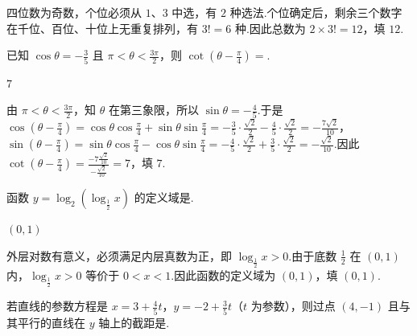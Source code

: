 \documentclass[UTF8,a4paper,oneside,11pt]{ctexbook}
\begin{document}
\begin{solution}
四位数为奇数，个位必须从 \(1\)、\(3\) 中选，有 \(2\) 种选法.个位确定后，剩余三个数字在千位、百位、十位上无重复排列，有 \(3!=6\) 种.因此总数为 \(2\times3!=12\)，填 \(12\).
\end{solution}

\begin{problem}

已知 \(\cos \theta=-\frac{3}{5}\) 且 \(\pi<\theta<\frac{3\pi}{2}\)，则 \(\cot\left( \theta-\frac{\pi}{4} \right)=\)\fillinblank{}.
\end{problem}

\begin{answer}
\(7\)
\end{answer}

\begin{solution}
由 \(\pi<\theta<\frac{3\pi}{2}\)，知 \(\theta\) 在第三象限，所以
\(\sin\theta=-\frac{4}{5}\).于是
\(\cos\left(\theta-\frac{\pi}{4}\right)=\cos\theta\cos\frac{\pi}{4}+\sin\theta\sin\frac{\pi}{4}=-\frac{3}{5}\cdot\frac{\sqrt{2}}{2}-\frac{4}{5}\cdot\frac{\sqrt{2}}{2}=-\frac{7\sqrt{2}}{10}\)，
\(\sin\left(\theta-\frac{\pi}{4}\right)=\sin\theta\cos\frac{\pi}{4}-\cos\theta\sin\frac{\pi}{4}=-\frac{4}{5}\cdot\frac{\sqrt{2}}{2}+\frac{3}{5}\cdot\frac{\sqrt{2}}{2}=-\frac{\sqrt{2}}{10}\).因此
\(\cot\left(\theta-\frac{\pi}{4}\right)=\frac{-7\frac{\sqrt{2}}{10}}{-\frac{\sqrt{2}}{10}}=7\)，填 \(7\).
\end{solution}

\begin{problem}

函数 \(y=\log_2\left( \log_{\frac{1}{2}}x \right)\) 的定义域是\fillinblank{}.
\end{problem}

\begin{answer}
\((0,1)\)
\end{answer}

\begin{solution}
外层对数有意义，必须满足内层真数为正，即
\(\log_{\frac{1}{2}}x>0\).由于底数 \(\frac{1}{2}\) 在 \((0,1)\) 内，\(\log_{\frac{1}{2}}x>0\) 等价于 \(0<x<1\).因此函数的定义域为 \((0,1)\)，填 \((0,1)\).
\end{solution}

\begin{problem}

若直线的参数方程是 \(x=3+\frac{4}{5}t\)，\(y=-2+\frac{3}{5}t\)（\(t\) 为参数），则过点 \((4,-1)\) 且与其平行的直线在 \(y\) 轴上的截距是\fillinblank{}.
\end{problem}
\end{document}
